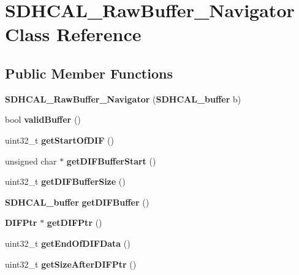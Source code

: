 \section{S\-D\-H\-C\-A\-L\-\_\-\-Raw\-Buffer\-\_\-\-Navigator Class Reference}
\label{classSDHCAL__RawBuffer__Navigator}
\subsection*{Public Member Functions}
\begin{DoxyCompactItemize}
\item 
{\bfseries S\-D\-H\-C\-A\-L\-\_\-\-Raw\-Buffer\-\_\-\-Navigator} ({\bf S\-D\-H\-C\-A\-L\-\_\-buffer} b)\label{classSDHCAL__RawBuffer__Navigator_a8116fb4c68067c7ecdfa3c9ad2de09cb}

\item 
bool {\bfseries valid\-Buffer} ()\label{classSDHCAL__RawBuffer__Navigator_af04cd664647277f7209475d939777cc4}

\item 
uint32\-\_\-t {\bfseries get\-Start\-Of\-D\-I\-F} ()\label{classSDHCAL__RawBuffer__Navigator_ac3f6143d2ec2cdf440b47ca6433251f1}

\item 
unsigned char $\ast$ {\bfseries get\-D\-I\-F\-Buffer\-Start} ()\label{classSDHCAL__RawBuffer__Navigator_a94dccfc4aac0d19eb20130a61d675e73}

\item 
uint32\-\_\-t {\bfseries get\-D\-I\-F\-Buffer\-Size} ()\label{classSDHCAL__RawBuffer__Navigator_a97bd22be6f726446cea9b3d141a36991}

\item 
{\bf S\-D\-H\-C\-A\-L\-\_\-buffer} {\bfseries get\-D\-I\-F\-Buffer} ()\label{classSDHCAL__RawBuffer__Navigator_a8b286baaaefc3a457e5c34457e8dccc2}

\item 
{\bf D\-I\-F\-Ptr} $\ast$ {\bfseries get\-D\-I\-F\-Ptr} ()\label{classSDHCAL__RawBuffer__Navigator_a40b03138306707a590f9fdf327d191c5}

\item 
uint32\-\_\-t {\bfseries get\-End\-Of\-D\-I\-F\-Data} ()\label{classSDHCAL__RawBuffer__Navigator_a3a220bfca852bd6ac038bfff69fa6765}

\item 
uint32\-\_\-t {\bfseries get\-Size\-After\-D\-I\-F\-Ptr} ()\label{classSDHCAL__RawBuffer__Navigator_a535452ee375e56a475ae52a4ffc1dcb9}


\end{DoxyCompactItemize}
